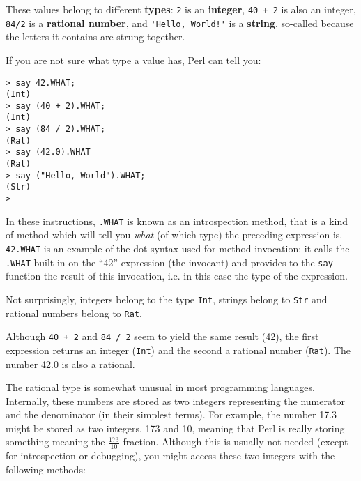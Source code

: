 These values belong to different {\bf types}:
{\tt 2} is an {\bf integer}, {\tt 40 + 2} is also an integer, 
{\tt 84/2} is a {\bf rational number},
and \verb"'Hello, World!'" is a {\bf string},
so-called because the letters it contains are strung together.

If you are not sure what type a value has, Perl can
tell you:

\begin{verbatim}
> say 42.WHAT;
(Int)
> say (40 + 2).WHAT;
(Int)
> say (84 / 2).WHAT;
(Rat)
> say (42.0).WHAT
(Rat)
> say ("Hello, World").WHAT;
(Str)
>
\end{verbatim}
%
In these instructions, {\tt .WHAT} is known as an 
introspection method, that is a kind of method which 
will tell you \emph{what} (of  which type) the preceding 
expression is. {\tt 42.WHAT} is an example of the dot 
syntax used for method invocation: it calls the {\tt .WHAT} 
built-in on the ``42'' expression (the invocant) and provides 
to the {\tt say} function the result of this invocation, 
i.e. in this case the type of the expression.

Not surprisingly, integers belong to the type {\tt Int},
strings belong to {\tt Str} and rational 
numbers belong to {\tt Rat}.  

Although {\tt 40 + 2} and {\tt 84 / 2} seem to yield the 
same result (42), the first expression returns an integer 
({\tt Int}) and the second a rational number ({\tt Rat}). 
The number 42.0 is also a rational.

The rational type is somewhat unusual in most programming 
languages. Internally, these numbers are stored as two 
integers representing the numerator and the denominator 
(in their simplest terms). For example, the number 17.3 
might be stored as two integers, 173 and 10, meaning that 
Perl is really storing something meaning the $\frac{173}{10}$ 
fraction. Although this is usually not needed (except 
for introspection or debugging), you might access these 
two integers with the following methods:

